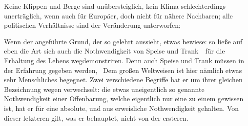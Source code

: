 \begin{aufzb}
\item Keine Klippen und Berge sind unübersteiglich, kein Klima schlechterdings unerträglich, wenn auch für Europäer, doch nicht für nähere Nachbaren; alle politischen Verhältnisse sind der Veränderung unterworfen; \usw\
\item Wenn der  angeführte Grund, der so gelehrt aussieht, etwas bewiese: so ließe auf eben die Art sich auch die Nothwendigkeit von Speise und Trank~\ für die Erhaltung des Lebens wegdemonstriren. Denn auch Speise und Trank müssen in der Erfahrung gegeben werden, \usw\ Dem großen Weltweisen ist hier nämlich etwas sehr Menschliches begegnet. Zwei verschiedene Begriffe hat er um ihrer gleichen Bezeichnung wegen verwechselt: die etwas uneigentlich so genannte Nothwendigkeit einer Offenbarung, welche eigentlich nur eine  zu einem gewissen  ist, hat er für eine absolute, und aus  erweisliche Nothwendigkeit gehalten. Von dieser letzteren gilt, was er behauptet, nicht von der ersteren.
\end{aufzb}

